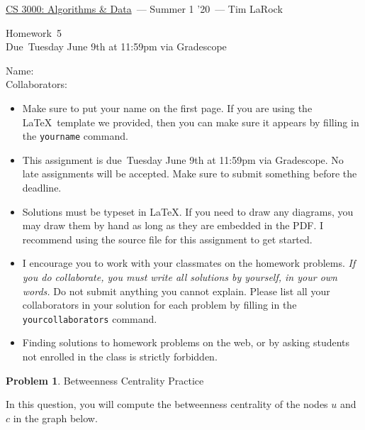 \documentclass[11pt]{article}
\newcommand{\yourname}{}
\newcommand{\yourcollaborators}{}
\newcommand{\course}{\href{tlarock.github.io/teaching/cs3000/syllabus.html}{CS 3000: Algorithms \& Data}}
\newcommand{\instructor}{Tim LaRock}
\newcommand{\semester}{Summer 1 '20}
\newcommand{\hwnum}{5}
\newcommand{\hwdue}{Tuesday June 9th at 11:59pm via Gradescope}
\theoremstyle{definition}
\theoremstyle{theorem}
\newtheorem{prob}{Problem}
\begin{document}
	{\Large 
		\begin{center} \course\ --- \semester\ --- \instructor \end{center}}
	{\large
		\vspace{10pt}
		\noindent Homework~\hwnum \vspace{2pt}\\
		Due~\hwdue}
	
	\bigskip
	{\large
		\noindent Name: \yourname \vspace{2pt}\\ Collaborators: \yourcollaborators}
	
	\vspace{15pt}
	\begin{itemize}
		
		\item Make sure to put your name on the first page.  If you are using the \LaTeX~template we provided, then you can make sure it appears by filling in the \texttt{yourname} command.
		
		\item This assignment is due~\hwdue.  No late assignments will be accepted.  Make sure to submit something before the deadline.
		
		\item Solutions must be typeset in \LaTeX.  If you need to draw any diagrams, you may draw them by hand as long as they are embedded in the PDF.  I recommend using the source file for this assignment to get started.
		
		\item I encourage you to work with your classmates on the homework problems. \emph{If you do collaborate, you must write all solutions by yourself, in your own words.}  Do not submit anything you cannot explain.  Please list all your collaborators in your solution for each problem by filling in the \texttt{yourcollaborators} command.
		
		\item Finding solutions to homework problems on the web, or by asking students not enrolled in the class is strictly forbidden.
		
	\end{itemize}


	\newpage
		\begin{prob} Betweenness Centrality Practice\end{prob}

In this question, you will compute the betweenness centrality of the nodes $u$ and $c$ in the graph below.
\end{document}
